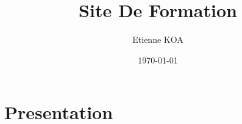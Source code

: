 \documentclass{article}
\title{Site De Formation}
\author{Etienne KOA}
\date{\today}  %
\begin{document}
\maketitle  %


\section{Presentation}\label{sec:Presentation}
\end{document}
